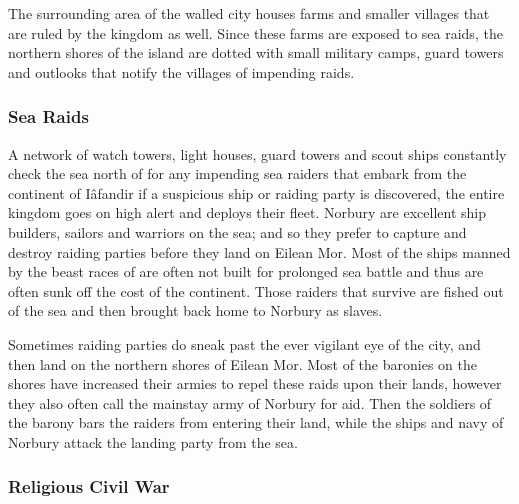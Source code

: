 The surrounding area of the walled city houses farms and smaller villages that
are ruled by the kingdom as well. Since these farms are exposed to sea raids,
the northern shores of the island are dotted with small military camps, guard
towers and outlooks that notify the villages of impending raids.

\subsubsection{Sea Raids}

A network of watch towers, light houses, guard towers and scout ships
constantly check the sea north of  for any impending
sea raiders that embark from the continent of Iâfandir if a suspicious ship or
raiding party is discovered, the entire kingdom goes on high alert and deploys
their fleet. Norbury are excellent ship builders, sailors and warriors on the
sea; and so they prefer to capture and destroy raiding parties before they
land on Eilean Mor. Most of the ships manned by the beast races of
 are often not built for prolonged sea battle and thus
are often sunk off the cost of the continent. Those raiders that survive are
fished out of the sea and then brought back home to Norbury as slaves.

Sometimes raiding parties do sneak past the ever vigilant eye of the city,
and then land on the northern shores of Eilean Mor. Most of the baronies
on the shores have increased their armies to repel these raids upon their
lands, however they also often call the mainstay army of Norbury for aid.
Then the soldiers of the barony bars the raiders from entering their land,
while the ships and navy of Norbury attack the landing party from the sea.

\subsubsection{Religious Civil War}
\label{sec:Religious Civil War}

